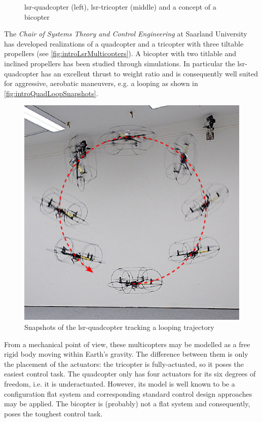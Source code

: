 \begin{figure}[ht]
 \centering
 
 \caption{lsr-quadcopter (left), lsr-tricopter (middle) and a concept of a bicopter}
 \label{fig:introLsrMulticopters}
\end{figure}

The \textit{Chair of Systems Theory and Control Engineering} at Saarland University has developed realizations of a quadcopter and a tricopter with three tiltable propellers (see \autoref{fig:introLsrMulticopters}).
A bicopter with two titlable and inclined propellers has been studied through simulations.
In particular the lsr-quadcopter has an excellent thrust to weight ratio and is consequently well suited for aggressive, aerobatic maneuvers, e.g. a looping as shown in \autoref{fig:introQuadLoopSnapshots}.

\begin{figure}[ht]
 \centering
 \includegraphics[width=.6\linewidth]{graphics/QuadLoopSnapshots}
 \caption{Snapshots of the lsr-quadcopter tracking a looping trajectory}
 \label{fig:introQuadLoopSnapshots}
\end{figure}

From a mechanical point of view, these multicopters may be modelled as a free rigid body moving within Earth's gravity.
The difference between them is only the placement of the actuators:
the tricopter is fully-actuated, so it poses the easiest control task.
The quadcopter only has four actuators for its six degrees of freedom, i.e. it is underactuated.
However, its model is well known to be a configuration flat system and corresponding standard control design approaches may be applied.
The bicopter is (probably) not a flat system and consequently, poses the toughest control task.



